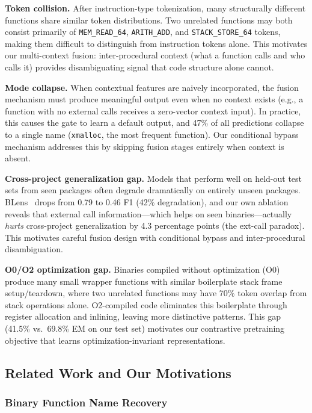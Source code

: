 \documentclass[sigconf,nonacm]{acmart}
\begin{document}
\textbf{Token collision.} After instruction-type tokenization, many structurally different functions share similar token distributions. Two unrelated functions may both consist primarily of \texttt{MEM\_READ\_64}, \texttt{ARITH\_ADD}, and \texttt{STACK\_STORE\_64} tokens, making them difficult to distinguish from instruction tokens alone. This motivates our multi-context fusion: inter-procedural context (what a function calls and who calls it) provides disambiguating signal that code structure alone cannot.

\textbf{Mode collapse.} When contextual features are naively incorporated, the fusion mechanism must produce meaningful output even when no context exists (e.g., a function with no external calls receives a zero-vector context input). In practice, this causes the gate to learn a default output, and 47\% of all predictions collapse to a single name (\texttt{xmalloc}, the most frequent function). Our conditional bypass mechanism addresses this by skipping fusion stages entirely when context is absent.

\textbf{Cross-project generalization gap.} Models that perform well on held-out test sets from seen packages often degrade dramatically on entirely unseen packages. BLens~\cite{blens} drops from 0.79 to 0.46 F1 (42\% degradation), and our own ablation reveals that external call information---which helps on seen binaries---actually \emph{hurts} cross-project generalization by 4.3 percentage points (the ext-call paradox). This motivates careful fusion design with conditional bypass and inter-procedural disambiguation.

\textbf{O0/O2 optimization gap.} Binaries compiled without optimization (O0) produce many small wrapper functions with similar boilerplate stack frame setup/teardown, where two unrelated functions may have 70\% token overlap from stack operations alone. O2-compiled code eliminates this boilerplate through register allocation and inlining, leaving more distinctive patterns. This gap (41.5\% vs.\ 69.8\% EM on our test set) motivates our contrastive pretraining objective that learns optimization-invariant representations.

\subsection{Related Work and Our Motivations}
\label{sec:related}

\subsubsection{Binary Function Name Recovery}
\end{document}
